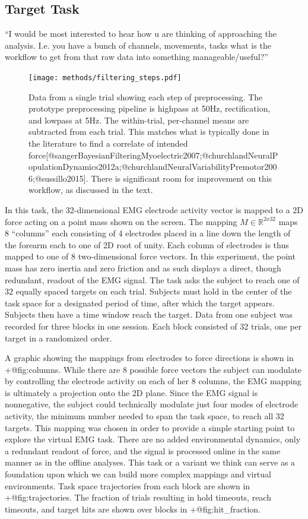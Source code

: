 \documentclass[../main.tex]{subfiles}
\begin{document}
\subsection{Target Task}

``I would be most interested to hear how u are thinking of approaching the analysis. I.e. you have a bunch of channels, movements, tasks what is the workflow to get from that raw data into something manageable/useful?''

\begin{figure}
  \centering
  \texttt{[image: methods/filtering\_steps.pdf]}
  \caption{Data from a single trial showing each step of preprocessing. The prototype preprocessing pipeline is highpass at 50Hz, rectification, and lowpass at 5Hz. The within-trial, per-channel means are subtracted from each trial. This matches what is typically done in the literature to find a correlate of intended force[@sangerBayesianFilteringMyoelectric2007;@churchlandNeuralPopulationDynamics2012a;@churchlandNeuralVariabilityPremotor2006;@sussillo2015]. There is significant room for improvement on this workflow, as discussed in the text.}\label{fig:filtering}
\end{figure}

In this task, the 32-dimensional EMG electrode activity vector is mapped to a 2D force acting on a point mass shown on the screen. The mapping $M\in\mathbb{R}^{2x32}$ maps 8 ``columns'' each consisting of 4 electrodes placed in a line down the length of the forearm each to one of 2D root of unity. Each column of electrodes is thus mapped to one of 8 two-dimensional force vectors. In this experiment, the point mass has zero inertia and zero friction and as such displays a direct, though redundant, readout of the EMG signal. The task asks the subject to reach one of 32 equally spaced targets on each trial. Subjects must hold in the center of the task space for a designated period of time, after which the target appears. Subjects then have a time window reach the target. Data from one subject was recorded for three blocks in one session. Each block consisted of 32 trials, one per target in a randomized order.

A graphic showing the mappings from electrodes to force directions is shown in {+@fig:columns}. While there are 8 possible force vectors the subject can modulate by controlling the electrode activity on each of her 8 columns, the EMG mapping is ultimately a projection onto the 2D plane. Since the EMG signal is nonnegative, the subject could technically modulate just four modes of electrode activity, the minimum number needed to span the task space, to reach all 32 targets. This mapping was chosen in order to provide a simple starting point to explore the virtual EMG task. There are no added environmental dynamics, only a redundant readout of force, and the signal is processed online in the same manner as in the offline analyses. This task or a variant we think can serve as a foundation upon which we can build more complex mappings and virtual environments. Task space trajectories from each block are shown in {+@fig:trajectories}. The fraction of trials resulting in hold timeouts, reach timeouts, and target hits are shown over blocks in {+@fig:hit_fraction}.
\end{document}
